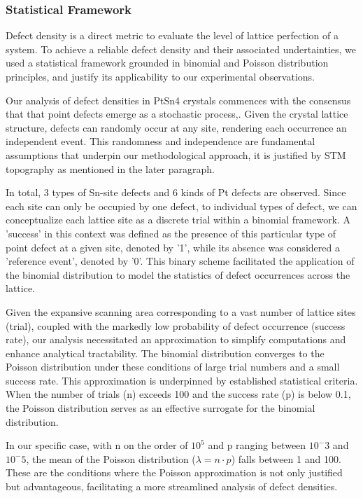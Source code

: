 \subsubsection{Statistical Framework}
Defect density is a direct metric to evaluate the level of lattice perfection of a system. To achieve a reliable defect density and their associated undertainties, we used a statistical framework grounded in binomial and Poisson distribution principles, and justify its applicability to our experimental observations.
\par Our analysis of defect densities in PtSn4 crystals commences with the consensus that that point defects emerge as a stochastic process\cite{rudolph_defect_2010},\cite{mosquera-lois_imperfections_2023}. Given the crystal lattice structure, defects can randomly occur at any site, rendering each occurrence an independent event. This randomness and independence are fundamental assumptions that underpin our methodological approach, it is justified by STM topography as mentioned in the later paragraph.  
\par In total, 3 types of Sn-site defects and 6 kinds of Pt defects are observed. Since each site can only be occupied by one defect, to individual types of defect, we can conceptualize each lattice site as a discrete trial within a binomial framework. A 'success' in this context was defined as the presence of this particular type of point defect at a given site, denoted by '1', while its absence was considered a 'reference event', denoted by '0'. This binary scheme facilitated the application of the binomial distribution to model the statistics of defect occurrences across the lattice.
\par Given the expansive scanning area corresponding to a vast number of lattice sites (trial), coupled with the markedly low probability of defect occurrence (success rate), our analysis necessitated an approximation to simplify computations and enhance analytical tractability. The 
binomial distribution converges to the Poisson distribution under these conditions of large trial numbers and a small success rate. This approximation is underpinned by established statistical criteria. When the number of trials (n) exceeds 100 and the success rate (p) is below 0.1, the Poisson distribution serves as an effective surrogate for the binomial distribution. 
\par In our specific case, with n on the order of $10^5$ and p ranging between $10^-3$ and $10^-5$, the mean of the Poisson distribution ($\lambda=n\cdot p$) falls between 1 and 100. These are the conditions where the Poisson approximation is not only justified but advantageous, facilitating a more streamlined analysis of defect densities.
